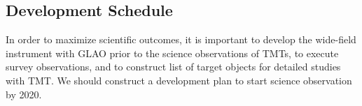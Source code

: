 \subsection{Development Schedule}

In order to maximize scientific outcomes, it is important to develop
the wide-field instrument with GLAO prior to the science observations of
TMTs, to execute survey observations, and to construct list of target
objects for detailed studies with TMT. We should construct a development
plan to start science observation by 2020.
